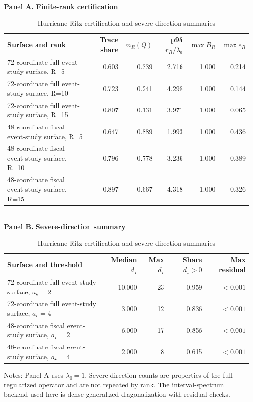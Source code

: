 \begin{table}[!htbp]
\centering
\caption{Hurricane Ritz certification and severe-direction summaries}
\label{tab:hurricane-ritz-certification}
\small
\textbf{Panel A. Finite-rank certification}\\[0.3em]
\begin{tabular}{lrrrrr}
\toprule
Surface and rank & Trace share & $m_R(Q)$ & p95 $r_R/\lambda_0$ & $\max B_R$ & $\max e_R$ \\
\midrule
72-coordinate full event-study surface, R=5 & 0.603 & 0.339 & 2.716 & 1.000 & 0.214 \\
72-coordinate full event-study surface, R=10 & 0.723 & 0.241 & 4.298 & 1.000 & 0.144 \\
72-coordinate full event-study surface, R=15 & 0.807 & 0.131 & 3.971 & 1.000 & 0.065 \\
48-coordinate fiscal event-study surface, R=5 & 0.647 & 0.889 & 1.993 & 1.000 & 0.436 \\
48-coordinate fiscal event-study surface, R=10 & 0.796 & 0.778 & 3.236 & 1.000 & 0.389 \\
48-coordinate fiscal event-study surface, R=15 & 0.897 & 0.667 & 4.318 & 1.000 & 0.326 \\
\bottomrule
\end{tabular}
\\[0.8em]
\textbf{Panel B. Severe-direction summary}\\[0.3em]
\begin{tabular}{lrrrr}
\toprule
Surface and threshold & Median $d_\star$ & Max $d_\star$ & Share $d_\star>0$ & Max residual \\
\midrule
72-coordinate full event-study surface, $a_\star=2$ & 10.000 & 23 & 0.959 & $<0.001$ \\
72-coordinate full event-study surface, $a_\star=4$ & 3.000 & 12 & 0.836 & $<0.001$ \\
48-coordinate fiscal event-study surface, $a_\star=2$ & 6.000 & 17 & 0.856 & $<0.001$ \\
48-coordinate fiscal event-study surface, $a_\star=4$ & 2.000 & 8 & 0.615 & $<0.001$ \\
\bottomrule
\end{tabular}
\begin{minipage}{0.96\linewidth}
\footnotesize Notes: Panel A uses $\lambda_0=1$. Severe-direction counts are properties of the full regularized operator and are not repeated by rank. The interval-spectrum backend used here is dense generalized diagonalization with residual checks.
\end{minipage}
\end{table}

